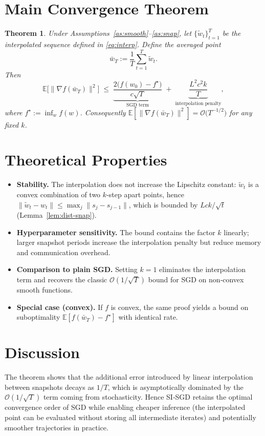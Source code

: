 \documentclass{article}
\newtheorem{theorem}{Theorem}
\newcommand{\E}{\mathbb{E}}
\begin{document}
\section*{Main Convergence Theorem}
\begin{theorem}\label{thm:main}
Under Assumptions~\ref{as:smooth}–\ref{as:snap}, let $\{\tilde w_t\}_{t=1}^T$ be the interpolated sequence defined in \eqref{eq:interp}. Define the averaged point
\[
    \bar w_T:=\frac1T\sum_{t=1}^T\tilde w_t .
\]
Then
\[
    \E\big[\|\nabla f(\bar w_T)\|^2\big]\;\le\;
    \underbrace{\frac{2\big(f(w_0)-f^\star\big)}{c\sqrt{T}}}_{\text{SGD term}}
    \;+\;
    \underbrace{\frac{L^2c^2k}{T}}_{\text{interpolation penalty}} ,
\]
where $f^\star:=\inf_{w}f(w)$. Consequently $\E[\|\nabla f(\bar w_T)\|^2]=\mathcal{O}\!\big(T^{-1/2}\big)$ for any fixed $k$.
\end{theorem}

\section*{Theoretical Properties}
\begin{itemize}
    \item \textbf{Stability.} The interpolation does not increase the Lipschitz constant: $\tilde w_t$ is a convex combination of two $k$‑step apart points, hence $\|\tilde w_t-w_t\|\le\max_{j}\|s_j-s_{j-1}\|$, which is bounded by $L c k/\sqrt{t}$ (Lemma~\ref{lem:dist-snap}).
    \item \textbf{Hyperparameter sensitivity.} The bound contains the factor $k$ linearly; larger snapshot periods increase the interpolation penalty but reduce memory and communication overhead.
    \item \textbf{Comparison to plain SGD.} Setting $k=1$ eliminates the interpolation term and recovers the classic $\mathcal{O}(1/\sqrt{T})$ bound for SGD on non‑convex smooth functions.
    \item \textbf{Special case (convex).} If $f$ is convex, the same proof yields a bound on suboptimality $ \E[f(\bar w_T)-f^\star]$ with identical rate.
\end{itemize}

\section*{Discussion}
The theorem shows that the additional error introduced by linear interpolation between snapshots decays as $1/T$, which is asymptotically dominated by the $\mathcal{O}(1/\sqrt{T})$ term coming from stochasticity. Hence SI‑SGD retains the optimal convergence order of SGD while enabling cheaper inference (the interpolated point can be evaluated without storing all intermediate iterates) and potentially smoother trajectories in practice.
\end{document}
